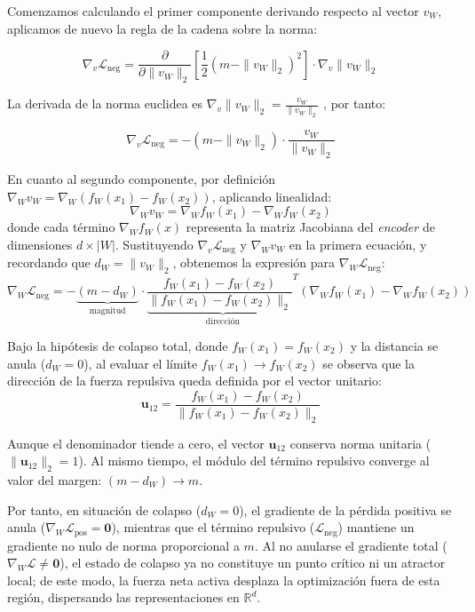 Comenzamos calculando el primer componente derivando respecto al vector $v_W$, aplicamos de nuevo la regla de la cadena sobre la norma:

\begin{equation}
\nabla_{v} \mathcal{L}_{\text{neg}} = \frac{\partial}{\partial \|v_W\|_2} \left[ \frac{1}{2} (m - \|v_W\|_2)^2 \right] \cdot \nabla_{v} \|v_W\|_2
\end{equation}

La derivada de la norma euclidea es $\nabla_{v} \|v_W\|_2 = \frac{v_W}{\|v_W\|_2} $ , por tanto:

\begin{equation}
\nabla_{v} \mathcal{L}_{\text{neg}} = - (m - \|v_W\|_2) \cdot \frac{v_W}{\|v_W\|_2}
\end{equation}

En cuanto al segundo componente, por definición $\nabla_W v_W = \nabla_W \left(f_W(x_1) - f_W(x_2) \right) $, aplicando linealidad:
\begin{equation}
\nabla_W v_W = \nabla_W f_W(x_1) - \nabla_W f_W(x_2)
\end{equation}
donde cada término $\nabla_W f_W(x)$ representa la matriz Jacobiana del \textit{encoder} de dimensiones $d \times |W|$. Sustituyendo $\nabla_{v} \mathcal{L}_{\text{neg}}$ y $\nabla_{W} v_W$ en la primera ecuación, y recordando que $d_W = \|v_W\|_2$, obtenemos la expresión para $\nabla_{W} \mathcal{L}_{\text{neg}}$:
\begin{equation}
\nabla_W \mathcal{L}_{\text{neg}} = - \underbrace{(m - d_W)}_{\text{magnitud}} \cdot \underbrace{\frac{f_W(x_1) - f_W(x_2)}{\|f_W(x_1) - f_W(x_2)\|_2}^T}_{\text{dirección}} \left( \nabla_W f_W(x_1) - \nabla_W f_W(x_2) \right)
\end{equation}

Bajo la hipótesis de colapso total, donde $f_W(x_1) = f_W(x_2)$ y la distancia se anula ($d_W = 0$), al evaluar el límite $f_W(x_1) \to f_W(x_2)$ se observa que la dirección de la fuerza repulsiva queda definida por el vector unitario:
\begin{equation}
\label{eq:u_12_vector}
\mathbf{u}_{12} = \frac{f_W(x_1) - f_W(x_2)}{\|f_W(x_1) - f_W(x_2)\|_2}
\end{equation}

Aunque el denominador tiende a cero, el vector $\mathbf{u}_{12}$ conserva norma unitaria ($\|\mathbf{u}_{12}\|_2 = 1$). Al mismo tiempo, el módulo del término repulsivo converge al valor del margen: $(m - d_W) \to m$.

Por tanto, en situación de colapso ($d_W = 0$), el gradiente de la pérdida positiva se anula ($\nabla_W \mathcal{L}_{\text{pos}} = \mathbf{0}$), mientras que el término repulsivo ($\mathcal{L}_{\text{neg}}$) mantiene un gradiente no nulo de norma proporcional a $m$. Al no anularse el gradiente total ($\nabla_W \mathcal{L} \neq \mathbf{0}$), el estado de colapso ya no constituye un punto crítico ni un atractor local; de este modo, la fuerza neta activa desplaza la optimización fuera de esta región, dispersando las representaciones en $\mathbb{R}^d$.

